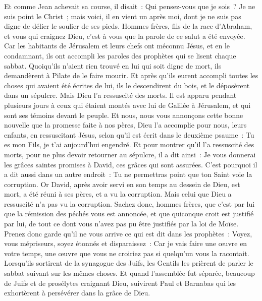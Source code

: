 \begin{multicols}{2}
Et comme Jean achevait sa course, il disait~: Qui pensez-vous que je sois~? Je ne suis point le Christ~; mais voici, il en vient un après moi, dont je ne suis pas digne de délier le soulier de ses pieds.
Hommes frères, fils de la race d'Abraham, et vous qui craignez Dieu, c'est à vous que la parole de ce salut a été envoyée.
Car les habitants de Jérusalem et leurs chefs ont méconnu Jésus, et en le condamnant, ils ont accompli les paroles des prophètes qui se lisent chaque sabbat.
Quoiqu'ils n'aient rien trouvé en lui qui soit digne de mort, ils demandèrent à Pilate de le faire mourir.
Et après qu'ils eurent accompli toutes les choses qui avaient été écrites de lui, ils le descendirent du bois, et le déposèrent dans un sépulcre.
Mais Dieu l'a ressuscité des morts.
Il est apparu pendant plusieurs jours à ceux qui étaient montés avec lui de Galilée à Jérusalem, et qui sont ses témoins devant le peuple.
Et nous, nous vous annonçons cette bonne nouvelle que la promesse faite à nos pères,
Dieu l'a accomplie pour nous, leurs enfants, en ressuscitant Jésus, selon qu'il est écrit dans le deuxième psaume~: Tu es mon Fils, je t'ai aujourd'hui engendré.
Et pour montrer qu'il l'a ressuscité des morts, pour ne plus devoir retourner au sépulcre, il a dit ainsi~: Je vous donnerai les grâces saintes promises à David, ces grâces qui sont assurées.
C'est pourquoi il a dit aussi dans un autre endroit~: Tu ne permettras point que ton Saint voie la corruption.
Or David, après avoir servi en son temps au dessein de Dieu, est mort, a été réuni à ses pères, et a vu la corruption.
Mais celui que Dieu a ressuscité n'a pas vu la corruption.
Sachez donc, hommes frères, que c'est par lui que la rémission des péchés vous est annoncée,
et que quiconque croit est justifié par lui, de tout ce dont vous n'avez pas pu être justifiés par la loi de Moïse.
Prenez donc garde qu'il ne vous arrive ce qui est dit dans les prophètes~:
Voyez, vous mépriseurs, soyez étonnés et disparaissez~: Car je vais faire une œuvre en votre temps, une œuvre que vous ne croiriez pas si quelqu'un vous la racontait.
Lorsqu'ils sortirent de la synagogue des Juifs, les Gentils les prièrent de parler le sabbat suivant sur les mêmes choses.
Et quand l'assemblée fut séparée, beaucoup de Juifs et de prosélytes craignant Dieu, suivirent Paul et Barnabas qui les exhortèrent à persévérer dans la grâce de Dieu.

\end{multicols}
